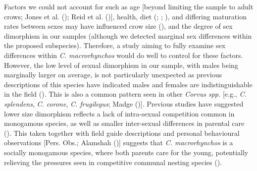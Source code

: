 \documentclass[10pt,a4paper]{article}
\begin{document}
Factors we could not account for such as age {[}beyond limiting the sample to adult crows; Jones et al. (); Reid et al. (){]}, health, diet (; ; ), and differing maturation rates between sexes may have influenced crow size (), and the degree of sex dimorphism in our samples (although we detected marginal sex differences within the proposed subspecies).
Therefore, a study aiming to fully examine sex differences within \emph{C. macrorhynchos} would do well to control for these factors.
However, the low level of sexual dimorphism in our sample, with males being marginally larger on average, is not particularly unexpected as previous descriptions of this species have indicated males and females are indistinguishable in the field ().
This is also a common pattern seen in other \emph{Corvus spp.} {[}e.g., \emph{C. splendens}, \emph{C. corone}, \emph{C. frugilegus}; Madge (){]}.
Previous studies have suggested lower size dimorphism reflects a lack of intra-sexual competition common in monogamous species, as well as smaller inter-sexual differences in parental care ().
This taken together with field guide descriptions and personal behavioural observations {[}Pers. Obs.; Alamshah (){]} suggests that \emph{C. macrorhynchos} is a socially monogamous species, where both parents care for the young, potentially relieving the pressures seen in competitive communal nesting species ().
\end{document}
